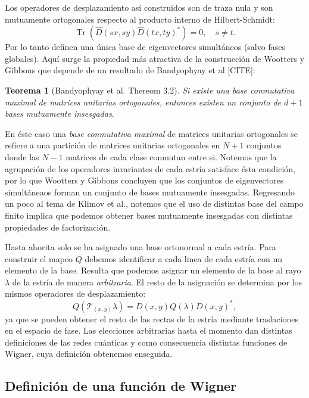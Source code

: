 \documentclass[a4paper]{report}
\DeclareMathOperator{\Tr}{Tr}
\newtheorem{theorem}{Teorema}
\begin{document}
  Los operadores de desplazamiento así construidos son de
  traza nula y son mutuamente ortogonales respecto al
  producto interno de Hilbert-Schmidt:
  \[
    \Tr\left( \hat D(sx,sy) \hat D(tx,ty)^{*} \right) 
    = 0,
    \quad s \neq t.
  \] 
  Por lo tanto definen una única base de eigenvectores
  simultáneos (salvo fases globales). Aquí surge la
  propiedad más atractiva de la construcción de Wootters y
  Gibbons que depende de un resultado de Bandyophyay et al
  [CITE]:
  \begin{theorem}[Bandyophyay et al. Thereom 3.2]
    Si existe una base conmutativa maximal de matrices
    unitarias ortogonales, entonces existen un conjunto de
    $d+1$ bases mutuamente insesgadas.
  \end{theorem}
  En éste caso una \textit{base conmutativa maximal} de
  matrices unitarias ortogonales se refiere a una partición
  de matrices unitarias ortogonales en $N+1$ conjuntos donde
  las $N-1$ matrices de cada clase conmutan entre si.
  Notemos que la agrupación de los operadores invariantes de
  cada estría satisface ésta condición, por lo que Wootters
  y Gibbons concluyen que los conjuntos de eigenvectores
  simultáneaos forman un conjunto de bases mutuamente
  insesgadas. Regresando un poco al tema de Klimov et al.,
  notemos que el uso de distintas base del campo finito
  implica que podemos obtener bases mutuamente insesgadas
  con distintas propiedades de factorización.

  Hasta ahorita solo se ha asignado una base ortonormal a
  cada estría. Para construir el mapeo $Q$ debemos
  identificar a cada linea de cada estría con un elemento de
  la base. Resulta que podemos asignar un elemento de la
  base al rayo $\lambda$ de la estría de manera
  \textit{arbitraria}.  El resto de la asignación se
  determina por los mismos operadores de desplazamiento:
  \[
    Q(\mathcal T_{(x,y)} \lambda)
    = D(x,y) Q(\lambda) D(x,y)^{*},
  \] 
  ya que se pueden obtener el resto de las rectas de la
  estría mediante traslaciones en el espacio de fase.  Las
  elecciones arbitrarias hasta el momento dan distintas
  definiciones de las redes cuánticas y como consecuencia
  distintas funciones de Wigner, cuya definición obtenemos
  enseguida.

  \subsection{Definición de una función de Wigner}
\end{document}
